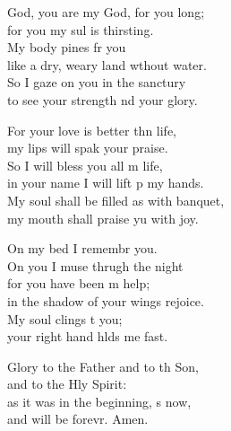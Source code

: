 \settowidth{\versewidth}{My soul shall be filled as with a banquet, *}
\begin{psalmverse}%
  \begin{patverse}
     God, you are my God, for you  long;\Med\\
for you my sul is thirsting.\\
My body pines fr you\Med\\
like a dry, weary land wthout water.\\
So I gaze on you in the sanctury\Med\\
to see your strength nd your glory.

For your love is better thn life,\Med\\
my lips will spak your praise.\\
So I will bless you all m life,\Med\\
in your name I will lift p my hands.\\
My soul shall be filled as with  banquet,\Med\\
my mouth shall praise yu with joy.

On my bed I remembr you.\Med\\
On you I muse thrugh the night\\
for you have been m help;\Med\\
in the shadow of your wings  rejoice.\\
My soul clings t you;\Med\\
your right hand hlds me fast.

Glory to the Father and to th Son,\Med\\
and to the Hly Spirit:\\
as it was in the beginning, \pointup{\i}s now,\Med\\
and will be forevr. Amen.
  \end{patverse}
\end{psalmverse}
